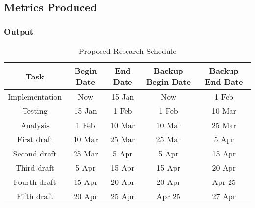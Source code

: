 \subsection{Metrics Produced}
\begin{frame}
  \frametitle{Output}
    \begin{center}
    \begin{table}[htbp]
      \centering
      \begin{tabular}{|c||c|c|c|c|}
        \hline

        \bf Task     & \bf Begin Date & \bf End Date & \bf Backup Begin Date & \bf Backup End Date\\ \hline\hline
        Implementation  & Now            & 15 Jan  & Now & 1 Feb   \\ \hline
        Testing & 15 Jan        & 1 Feb   & 1 Feb & 10 Mar  \\ \hline
        Analysis  & 1 Feb        & 10 Mar  & 10 Mar &  25 Mar     \\ \hline
        First draft & 10 Mar          & 25 Mar  & 25 Mar &  5 Apr   \\ \hline
        Second draft  & 25 Mar         & 5 Apr  & 5 Apr &  15 Apr   \\ \hline
        Third draft  & 5 Apr         & 15 Apr  & 15 Apr &  20 Apr   \\ \hline
        Fourth draft  & 15 Apr         & 20 Apr  & 20 Apr &  Apr 25   \\ \hline
        Fifth draft  & 20 Apr         & 25 Apr  & Apr 25 & 27 Apr     \\ \hline

      \end{tabular}
      \caption{Proposed Research Schedule}~\label{intro-tab1}
    \end{table}
    \end{center}
\end{frame}
